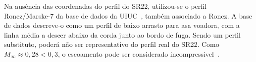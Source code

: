 Na ausência das coordenadas do perfil do SR22, utilizou-se o perfil
Roncz/Marske-7 da base de dados da UIUC~\cite{uiuc_coord}, também associado a Roncz. A base de
dados descreve-o como um perfil de baixo arrasto para asa voadora, com
a linha média a descer abaixo da corda junto ao bordo de fuga. Sendo um perfil substituto, poderá não ser
representativo do perfil real do SR22. Como
$M_\infty \approx 0{,}28 < 0{,}3$, o escoamento pode ser considerado
incompressível~\cite{anderson}.
